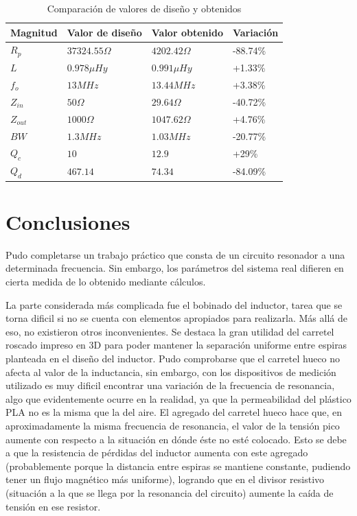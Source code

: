 \documentclass{article}
\begin{document}
\begin{table}[h]
    \centering
    \label{tabla-2}
    \begin{tabular}{|l|l|l|l|}
    \hline
    \textbf{Magnitud} & \textbf{Valor de diseño} & \textbf{Valor obtenido} & \textbf{Variación} \\ \hline
    $R_p$ & $37324.55 \Omega$ & $4202.42 \Omega$ & -88.74\% \\ \hline
    $L$ & $0.978 \mu Hy$ & $0.991 \mu Hy$ & +1.33\% \\ \hline
    $f_o$ & $13 MHz$ & $13.44 MHz$ & +3.38\% \\ \hline
    $Z_{in}$ & $50 \Omega$ & $29.64 \Omega$ & -40.72\% \\ \hline
    $Z_{out}$ & $1000 \Omega$ & $1047.62 \Omega$ & +4.76\% \\ \hline
    $BW$ & $1.3 MHz$ & $1.03 MHz$ & -20.77\% \\ \hline
    $Q_c$ & $10$ & $12.9$ & +29\% \\ \hline
    $Q_d$ & $467.14$ & $74.34$ & -84.09\% \\ \hline
    \end{tabular}
    \caption{Comparación de valores de diseño y obtenidos}
\end{table}
\newpage
\section{Conclusiones}
Pudo completarse un trabajo práctico que consta de un circuito resonador a una determinada frecuencia. Sin embargo, los parámetros del sistema real difieren en cierta medida de lo obtenido mediante cálculos.

La parte considerada más complicada fue el bobinado del inductor, tarea que se torna dificil si no se cuenta con elementos apropiados para realizarla. Más allá de eso, no existieron otros inconvenientes. Se destaca la gran utilidad del carretel roscado impreso en 3D para poder mantener la separación uniforme entre espiras planteada en el diseño del inductor. Pudo comprobarse que el carretel hueco no afecta al valor de la inductancia, sin embargo, con los dispositivos de medición utilizado es muy dificil encontrar una variación de la frecuencia de resonancia, algo que evidentemente ocurre en la realidad, ya que la permeabilidad del plástico PLA no es la misma que la del aire. El agregado del carretel hueco hace que, en aproximadamente la misma frecuencia de resonancia, el valor de la tensión pico aumente con respecto a la situación en dónde éste no esté colocado. Esto se debe a que la resistencia de pérdidas del inductor aumenta con este agregado (probablemente porque la distancia entre espiras se mantiene constante, pudiendo tener un flujo magnético más uniforme), logrando que en el divisor resistivo (situación a la que se llega por la resonancia del circuito) aumente la caída de tensión en ese resistor.
\end{document}
